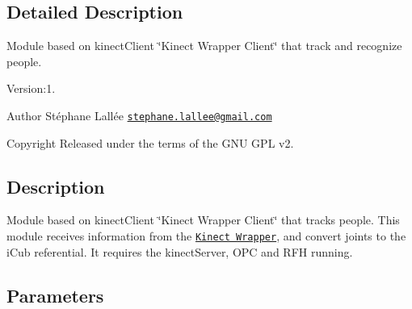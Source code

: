 \subsection{Detailed Description}
Module based on kinect\+Client \char`\"{}\+Kinect Wrapper Client\char`\"{} that track and recognize people. 

Version\+:1. \begin{DoxyAuthor}{Author}
Stéphane Lallée \href{mailto:stephane.lallee@gmail.com}{\tt stephane.\+lallee@gmail.\+com} ~\newline
 
\end{DoxyAuthor}
\begin{DoxyCopyright}{Copyright}
Released under the terms of the G\+NU G\+PL v2. 
\end{DoxyCopyright}
\hypertarget{group__touchDetector_intro_sec}{}\subsection{Description}\label{group__touchDetector_intro_sec}
Module based on kinect\+Client \char`\"{}\+Kinect Wrapper Client\char`\"{} that tracks people. This module receives information from the \href{https://github.com/robotology/kinect-wrapper}{\tt Kinect Wrapper}, and convert joints to the i\+Cub referential. It requires the kinect\+Server, O\+PC and R\+FH running.\hypertarget{group__touchDetector_parameters_sec}{}\subsection{Parameters}\label{group__touchDetector_parameters_sec}

